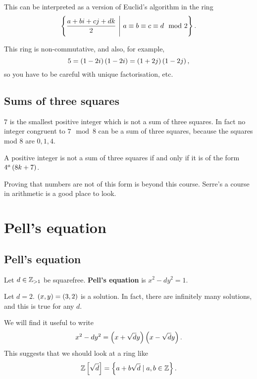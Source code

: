 \begin{remark1}
This can be interpreted as a version of Euclid's algorithm in the ring
$$ \cb{\dfrac{a + bi + cj + dk}{2} \ \Bigg| \ a \equiv b \equiv c \equiv d \mod 2}. $$
\end{remark1}

\begin{note}
This ring is non-commutative, and also, for example,
$$ 5 = \left( 1 - 2i \right)\left( 1 - 2i \right) = \left( 1 + 2j \right)\left( 1 - 2j \right), $$
so you have to be careful with unique factorisation, etc.
\end{note}

\subsection{Sums of three squares}

$ 7 $ is the smallest positive integer which is not a sum of three squares. In fact no integer congruent to $ 7 \mod 8 $ can be a sum of three squares, because the squares mod $ 8 $ are $ 0, 1, 4 $.

\begin{theorem}
A positive integer is not a sum of three squares if and only if it is of the form $ 4^a\left( 8k + 7 \right) $.
\end{theorem}

Proving that numbers are not of this form is beyond this course. Serre's a course in arithmetic is a good place to look.

\pagebreak

\section{Pell's equation}

\subsection{Pell's equation}

Let $ d \in \mathbb{Z}_{> 1} $ be squarefree. \textbf{Pell's equation} is $ x^2 - dy^2 = 1 $.

\begin{example2}
Let $ d = 2 $. $ \left( x, y \right) = \left( 3, 2 \right) $ is a solution. In fact, there are infinitely many solutions, and this is true for any $ d $.
\end{example2}

We will find it useful to write
$$ x^2 - dy^2 = \left( x + \sqrt{d}y \right)\left( x - \sqrt{d}y \right). $$
This suggests that we should look at a ring like
$$ \mathbb{Z}\left[ \sqrt{d} \right] = \left\{ a + b\sqrt{d} \mid a, b \in \mathbb{Z} \right\}. $$

